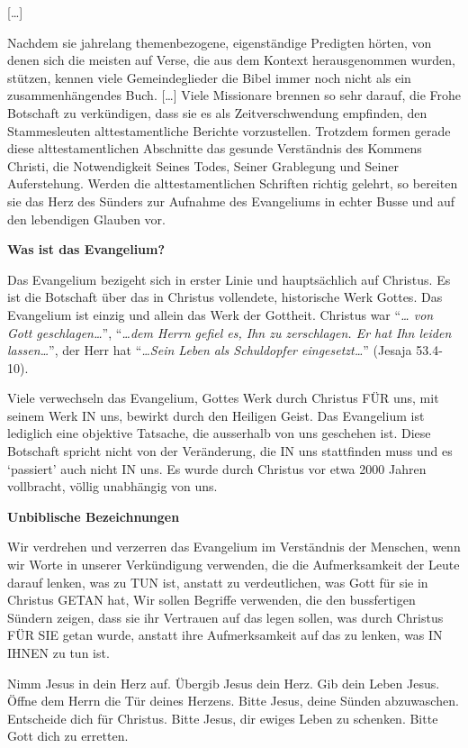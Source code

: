 \documentclass[
  12pt,
]{krantz}
\renewenvironment{quote}{\begin{VF}}{\end{VF}}
\begin{document}
{[}\ldots{]}

Nachdem sie jahrelang themenbezogene, eigenständige Predigten hörten, von denen
sich die meisten auf Verse, die aus dem Kontext herausgenommen wurden,
stützen, kennen viele Gemeindeglieder die Bibel immer noch nicht als ein
zusammenhängendes Buch. {[}\ldots{]} Viele Missionare brennen so sehr darauf, die
Frohe Botschaft zu verkündigen, dass sie es als Zeitverschwendung empfinden,
den Stammesleuten alttestamentliche Berichte vorzustellen. Trotzdem formen
gerade diese alttestamentlichen Abschnitte das gesunde Verständnis des Kommens
Christi, die Notwendigkeit Seines Todes, Seiner Grablegung und Seiner
Auferstehung. Werden die alttestamentlichen Schriften richtig gelehrt,
so bereiten sie das Herz des Sünders zur Aufnahme des Evangeliums in echter
Busse und auf den lebendigen Glauben vor.

\textbf{Was ist das Evangelium?}

Das Evangelium bezigeht sich in erster Linie und hauptsächlich auf Christus.
Es ist die Botschaft über das in Christus vollendete, historische Werk Gottes.
Das Evangelium ist einzig und allein das Werk der Gottheit. Christus war
``\emph{\ldots{} von Gott geschlagen\ldots{}}'', ``\emph{\ldots dem Herrn gefiel es, Ihn zu zerschlagen.
Er hat Ihn leiden lassen\ldots{}}'', der Herr hat ``\emph{\ldots Sein Leben als Schuldopfer
eingesetzt\ldots{}}'' (Jesaja 53.4-10).

Viele verwechseln das Evangelium, Gottes Werk durch Christus FÜR uns, mit
seinem Werk IN uns, bewirkt durch den Heiligen Geist. Das Evangelium ist
lediglich eine objektive Tatsache, die ausserhalb von uns geschehen ist. Diese
Botschaft spricht nicht von der Veränderung, die IN uns stattfinden muss und
es `passiert' auch nicht IN uns. Es wurde durch Christus vor etwa 2000 Jahren
vollbracht, völlig unabhängig von uns.

\textbf{Unbiblische Bezeichnungen}

Wir verdrehen und verzerren das Evangelium im Verständnis der Menschen, wenn
wir Worte in unserer Verkündigung verwenden, die die Aufmerksamkeit der Leute
darauf lenken, was zu TUN ist, anstatt zu verdeutlichen, was Gott für sie
in Christus GETAN hat, Wir sollen Begriffe verwenden, die den bussfertigen
Sündern zeigen, dass sie ihr Vertrauen auf das legen sollen, was durch Christus
FÜR SIE getan wurde, anstatt ihre Aufmerksamkeit auf das zu lenken, was IN
IHNEN zu tun ist.

\begin{quote}
Nimm Jesus in dein Herz auf.
Übergib Jesus dein Herz.
Gib dein Leben Jesus.
Öffne dem Herrn die Tür deines Herzens.
Bitte Jesus, deine Sünden abzuwaschen.
Entscheide dich für Christus.
Bitte Jesus, dir ewiges Leben zu schenken.
Bitte Gott dich zu erretten.
\end{quote}
\end{document}
